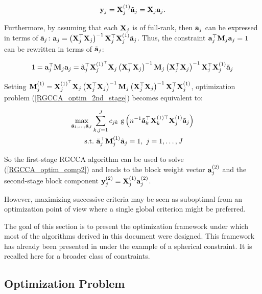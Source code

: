 \documentclass[
]{jss}
\begin{document}
\begin{equation}
    \mathbf{y}_j = \mathbf{X}_j^{(1)}\tilde{\mathbf{a}}_j = \mathbf{X}_j\mathbf{a}_j.
\end{equation}

Furthermore, by assuming that each \(\mathbf{X}_j\) is of full-rank, then
\(\mathbf{a}_j\) can be expressed in terms of \(\tilde{\mathbf{a}}_j\):
\(\mathbf{a}_j = \left( \mathbf{X}_j^\top \mathbf{X}_j\right)^{-1}\mathbf{X}_j^\top\mathbf{X}_j^{(1)}\tilde{\mathbf{a}}_j\).
Thus, the constraint \(\mathbf{a}_j^\top\mathbf{M}_j\mathbf{a}_j = 1\) can be rewritten in
terms of \(\tilde{\mathbf{a}}_j\):

\begin{equation}
    1 = \mathbf{a}_j^\top\mathbf{M}_j\mathbf{a}_j = \tilde{\mathbf{a}}_j^\top\mathbf{X}_j^{(1)^\top} \mathbf{X}_j \left( \mathbf{X}_j^\top \mathbf{X}_j\right)^{-1}\mathbf{M}_j\left( \mathbf{X}_j^\top \mathbf{X}_j\right)^{-1}\mathbf{X}_j^\top\mathbf{X}_j^{(1)}\tilde{\mathbf{a}}_j
\end{equation}

Setting
\(\mathbf{M}_j^{(1)} = \mathbf{X}_j^{(1)^\top} \mathbf{X}_j \left( \mathbf{X}_j^\top \mathbf{X}_j\right)^{-1}\mathbf{M}_j\left( \mathbf{X}_j^\top \mathbf{X}_j\right)^{-1}\mathbf{X}_j^\top\mathbf{X}_j^{(1)}\),
optimization problem (\ref{RGCCA_optim_2nd_stage}) becomes equivalent
to:

\begin{equation}
    \begin{gathered}
        \underset{\tilde{\mathbf{a}}_1, \ldots, \tilde{\mathbf{a}}_J}{\text{max}} \sum_{k, j = 1}^J c_{jk} \text{ g}\left(n^{-1}\tilde{\mathbf{a}}_k^\top \mathbf{X}_k^{(1)\top} \mathbf{X}_j^{(1)} \tilde{\mathbf{a}}_j \right)
        \\
        \text{~s.t.~} \tilde{\mathbf{a}}_j^\top\mathbf{M}_j^{(1)}\tilde{\mathbf{a}}_j = 1, ~j = 1, \ldots, J
    \label{RGCCA_optim_comp2}
    \end{gathered}
\end{equation}

So the first-stage RGCCA algorithm can be used to solve
(\ref{RGCCA_optim_comp2}) and leads to the block weight vector
\(\mathbf{a}_j^{(2)}\) and the second-stage block component
\(\mathbf{y}_j^{(2)} = \mathbf{X}_j^{(1)} \mathbf{a}_j^{(2)}\).

However, maximizing successive criteria may be seen as suboptimal from
an optimization point of view where a single global criterion might be
preferred.

The goal of this section is to present the optimization framework under
which most of the algorithms derived in this document were designed.
This framework has already been presented in \citep{Tenenhaus2017} under
the example of a spherical constraint. It is recalled here for a broader
class of constraints.

\hypertarget{optimization-problem}{%
\subsection{Optimization Problem}\label{optimization-problem}}
\end{document}
